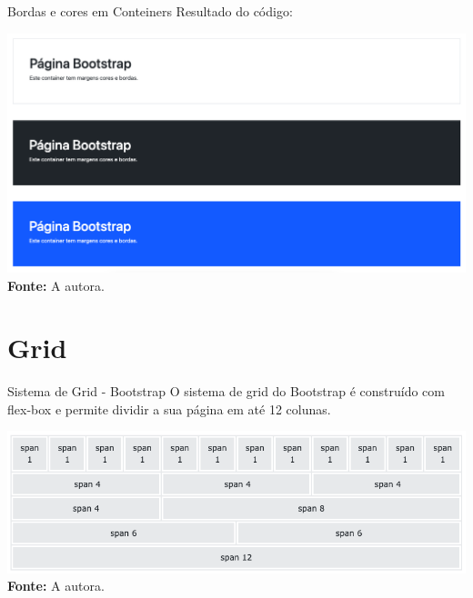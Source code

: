 \documentclass{beamer}
\begin{document}
\begin{frame}{Bordas e cores em Conteiners}
Resultado do código:\\
\begin{center}
       \includegraphics[height=0.5\paperheight]{fig/aula6/aula6_5.png} \\
       \tiny{\textbf{Fonte: } A autora.}
      \end{center}
\end{frame}

\section{Grid}
\begin{frame}{Sistema de Grid - Bootstrap}
O sistema de grid do Bootstrap é construído com flex-box e permite dividir a sua página em até 12 colunas.\\
\begin{center}
       \includegraphics[height=0.35\paperheight]{fig/aula6/aula6_6.png} \\
       \tiny{\textbf{Fonte: } A autora.}
      \end{center}
\end{frame}
\end{document}
